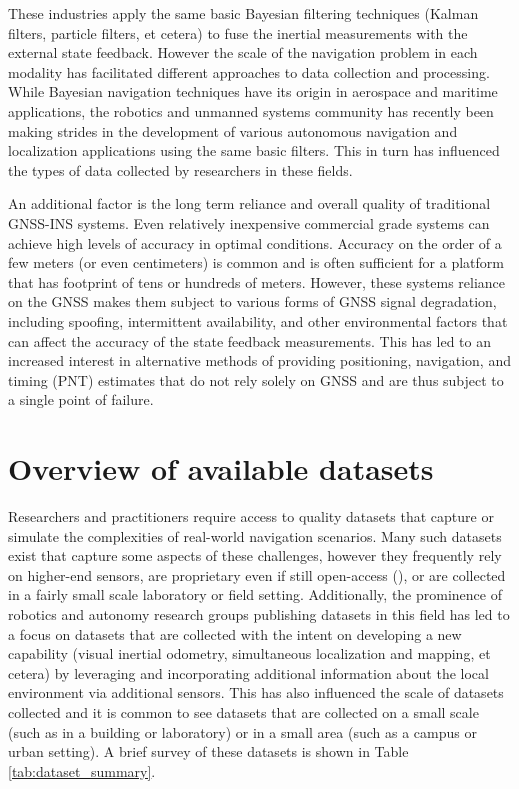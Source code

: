 \documentclass[sageh,times]{sagej}
\begin{document}
These industries apply the same basic Bayesian filtering techniques (Kalman filters, particle filters, et cetera) to fuse the inertial measurements with the external state feedback. However the scale of the navigation problem in each modality has facilitated different approaches to data collection and processing. While Bayesian navigation techniques have its origin in aerospace and maritime applications, the robotics and unmanned systems community has recently been making strides in the development of various autonomous navigation and localization applications using the same basic filters. This in turn has influenced the types of data collected by researchers in these fields.

An additional factor is the long term reliance and overall quality of traditional GNSS-INS systems. Even relatively inexpensive commercial grade systems can achieve high levels of accuracy in optimal conditions. Accuracy on the order of a few meters (or even centimeters) is common and is often sufficient for a platform that has footprint of tens or hundreds of meters. However, these systems reliance on the GNSS makes them subject to various forms of GNSS signal degradation, including spoofing, intermittent availability, and other environmental factors that can affect the accuracy of the state feedback measurements. This has led to an increased interest in alternative methods of providing positioning, navigation, and timing (PNT) estimates that do not rely solely on GNSS and are thus subject to a single point of failure.

\section{Overview of available datasets}
Researchers and practitioners require access to quality datasets that capture or simulate the complexities of real-world navigation scenarios. Many such datasets exist that capture some aspects of these challenges, however they frequently rely on higher-end sensors, are proprietary even if still open-access (\cite{waymo}), or are collected in a fairly small scale laboratory or field setting. Additionally, the prominence of robotics and autonomy research groups publishing datasets in this field has led to a focus on datasets that are collected with the intent on developing a new capability (visual inertial odometry, simultaneous localization and mapping, et cetera) by leveraging and incorporating additional information about the local environment via additional sensors. This has also influenced the scale of datasets collected and it is common to see datasets that are collected on a small scale (such as in a building or laboratory) or in a small area (such as a campus or urban setting). A brief survey of these datasets is shown in Table \ref{tab:dataset_summary}.
\end{document}
